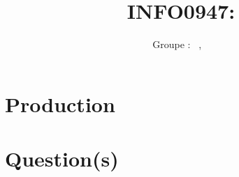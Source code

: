 \documentclass[a4paper, 11pt, oneside]{article}
\title{INFO0947: \intitule}
\author{Groupe \GrNbr : \PrenomUN~\textsc{\NomUN}, \PrenomDEUX~\textsc{\NomDEUX}}
\date{}
\begin{document}
\maketitle


\section{Production}



\section{Question(s)}

\end{document}
